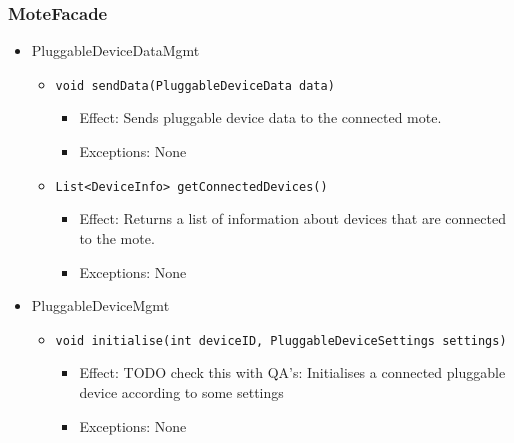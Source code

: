     \subsubsection{MoteFacade}
    \begin{itemize}
        \item PluggableDeviceDataMgmt
        \begin{itemize}
            \item \texttt{void sendData(PluggableDeviceData data)}
            \begin{itemize}
                \item Effect: Sends pluggable device data to the connected mote.
                \item Exceptions: None
            \end{itemize}
            \item \texttt{List<DeviceInfo> getConnectedDevices()}
            \begin{itemize}
                \item Effect: Returns a list of information about devices that are connected to the mote.
                \item Exceptions: None
            \end{itemize}
        \end{itemize}

        \item PluggableDeviceMgmt
        \begin{itemize}
            \item \texttt{void initialise(int deviceID, PluggableDeviceSettings settings)}
            \begin{itemize}
                \item Effect: TODO check this with QA's: Initialises a connected pluggable device according to some settings
                \item Exceptions: None
            \end{itemize}
        \end{itemize}
    \end{itemize}

